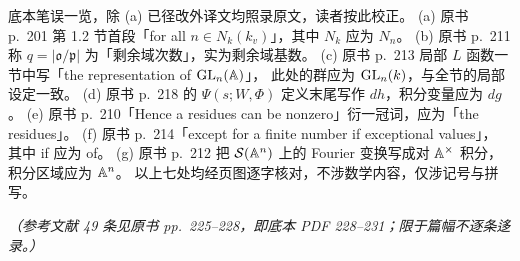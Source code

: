 \begin{annote}
底本笔误一览，除 (a) 已径改外译文均照录原文，读者按此校正。
(a) 原书 p.~201 第 1.2 节首段「for all $n\in N_k(k_v)$」，其中 $N_k$ 应为 $N_n$。
(b) 原书 p.~211 称 $q=|\mathfrak{o}/\mathfrak{p}|$ 为「剩余域次数」，实为剩余域基数。
(c) 原书 p.~213 局部 $L$ 函数一节中写「the representation of $\mathrm{GL}_n(\mathbb{A})$」，
此处的群应为 $\mathrm{GL}_n(k)$，与全节的局部设定一致。
(d) 原书 p.~218 的 $\Psi(s;W,\Phi)$ 定义末尾写作 $dh$，积分变量应为 $dg$。
(e) 原书 p.~210「Hence a residues can be nonzero」衍一冠词，应为「the residues」。
(f) 原书 p.~214「except for a finite number if exceptional values」，
其中 if 应为 of。
(g) 原书 p.~212 把 $\mathcal{S}(\mathbb{A}^n)$ 上的 Fourier 变换写成对 $\mathbb{A}^\times$ 积分，
积分区域应为 $\mathbb{A}^n$。
以上七处均经页图逐字核对，不涉数学内容，仅涉记号与拼写。
\par{}
\end{annote}

\par\medskip
\noindent\textit{（参考文献 49 条见原书 pp.~225--228，即底本 PDF 228--231；限于篇幅不逐条迻录。）}
